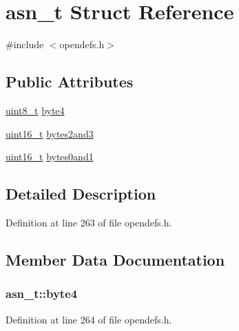 \hypertarget{structasn__t}{}\section{asn\+\_\+t Struct Reference}
\label{structasn__t}


{\ttfamily \#include $<$opendefs.\+h$>$}

\subsection*{Public Attributes}
\begin{DoxyCompactItemize}
\item 
\hyperlink{_p_e___types_8h_aba7bc1797add20fe3efdf37ced1182c5}{uint8\+\_\+t} \hyperlink{structasn__t_af158e9c9bc092ed0347896a9c024c258}{byte4}
\item 
\hyperlink{_p_e___types_8h_a1f1825b69244eb3ad2c7165ddc99c956}{uint16\+\_\+t} \hyperlink{structasn__t_ae7a99f086ee6e28c6c72e248b6041b95}{bytes2and3}
\item 
\hyperlink{_p_e___types_8h_a1f1825b69244eb3ad2c7165ddc99c956}{uint16\+\_\+t} \hyperlink{structasn__t_a9d2a032fe9b1adf08fc25d1cc73e8745}{bytes0and1}
\end{DoxyCompactItemize}


\subsection{Detailed Description}


Definition at line 263 of file opendefs.\+h.



\subsection{Member Data Documentation}
\subsubsection[{\texorpdfstring{byte4}{byte4}}]{ asn\+\_\+t\+::byte4}\hypertarget{structasn__t_af158e9c9bc092ed0347896a9c024c258}{}\label{structasn__t_af158e9c9bc092ed0347896a9c024c258}


Definition at line 264 of file opendefs.\+h.

